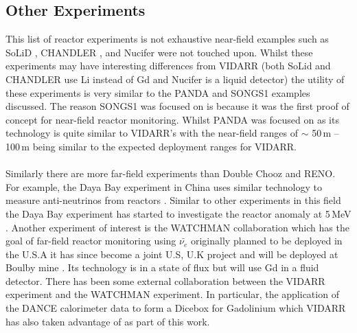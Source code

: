 \subsection{Other Experiments}
This list of reactor experiments is not exhaustive near-field examples such as SoLiD \cite{Solid_readout}, CHANDLER \cite{aap2015}, and Nucifer \cite{nucifer2016} were not touched upon. Whilst these experiments may have interesting differences from VIDARR (both SoLid and CHANDLER use Li instead of Gd and Nucifer is a liquid detector) the utility of these experiments is very similar to the PANDA and SONGS1 examples discussed. The reason SONGS1 was focused on is because it was the first proof of concept for near-field reactor monitoring. Whilst PANDA was focused on as its technology is quite similar to VIDARR's with the near-field ranges of $\sim$ 50\,m -- 100\,m being similar to the expected deployment ranges for VIDARR. 
\\\\Similarly there are more far-field experiments than Double Chooz and RENO. For example, the Daya Bay experiment in China uses similar technology to measure anti-neutrinos from reactors \cite{DayaBay2007Precision}. Similar to other experiments in this field the Daya Bay experiment has started to investigate the reactor anomaly at 5\,MeV \cite{Daya_Bay_2017}. Another experiment of interest is the WATCHMAN collaboration which has the goal of far-field reactor monitoring using $\bar{\nu_e}$ originally planned to be deployed in the U.S.A \cite{askins2015physics} it has since become a joint U.S, U.K project and will be deployed at Boulby mine \cite{burns2018remote}. Its technology is in a state of flux but will use Gd in a fluid detector. There has been some external collaboration between the VIDARR experiment and the WATCHMAN experiment. In particular, the application of the DANCE calorimeter data to form a Dicebox for Gadolinium which VIDARR has also taken advantage of as part of this work. 


